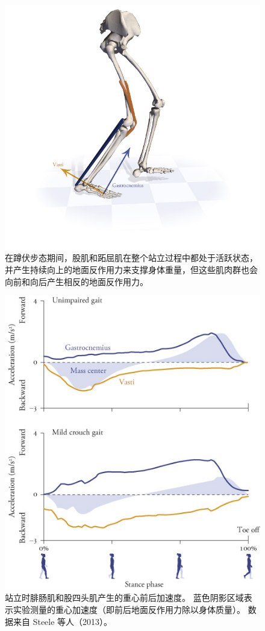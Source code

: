 \begin{figure}[!htb]
	\centering
	\includegraphics[width=1.0\linewidth]{chap11/11_13}
	\caption{在蹲伏步态期间，股肌和跖屈肌在整个站立过程中都处于活跃状态，并产生持续向上的地面反作用力来支撑身体重量，但这些肌肉群也会向前和向后产生相反的地面反作用力。 \label{fig:11_13}}
\end{figure}


\begin{figure}[!htb]
	\centering
	\includegraphics[width=0.9\linewidth]{chap11/11_14}
	\caption{站立时腓肠肌和股四头肌产生的重心前后加速度。
		蓝色阴影区域表示实验测量的重心加速度（即前后地面反作用力除以身体质量）。
		数据来自 Steele 等人（2013）。 \label{fig:11_14}}
\end{figure}


